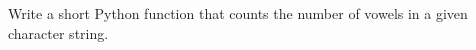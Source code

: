  \label{sssec:ex1_24}

Write a short Python function that counts the number of vowels in a given character string.

